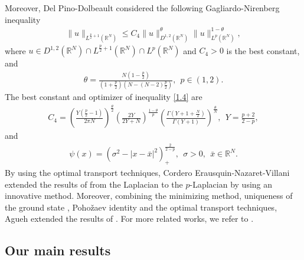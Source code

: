 \documentclass[12pt,a4paper,reqno]{amsart}
\numberwithin{equation}{section}
\begin{document}
Moreover, Del Pino-Dolbeault\cite[Theorem 2]{DelPino-Dolbeault2002JMPA}
considered the following Gagliardo-Nirenberg inequality
\begin{equation}\label{1.4}
\begin{aligned}
\|u\|_{L^{\frac{p}{2}+1}(\mathbb{R}^{N})}
\leqslant
C_{4}
\|u\|_{D^{1,2}(\mathbb{R}^{N})}^{\theta}
\|u\|_{L^{p}(\mathbb{R}^{N})}^{1-\theta},
\end{aligned}
\end{equation}
where $u\in D^{1,2}(\mathbb{R}^{N})\cap L^{\frac{p}{2}+1}(\mathbb{R}^{N})\cap L^{p}(\mathbb{R}^{N})$ and $C_{4}>0$ is the best constant, and
\begin{equation*}
\begin{aligned}
\theta=\frac{N(1-\frac{p}{2})}{(1+\frac{p}{2})(N-(N-2)\frac{p}{2})},~~p\in(1,2).
\end{aligned}
\end{equation*}
The best constant and optimizer of inequality \eqref{1.4} are
\begin{equation*}
\begin{aligned}
C_{4}
=
\left(
\frac{Y(\frac{p}{2}-1)}{2\pi N}
\right)^{\frac{\theta}{2}}
\left(
\frac{2Y}{2Y+N}
\right)^{\frac{1-\theta}{p}}
\left(
\frac{\Gamma(Y+1+\frac{N}{2})}{\Gamma(Y+1)}
\right)^{\frac{\theta}{N}},
~~
Y=\frac{p+2}{2-p},
\end{aligned}
\end{equation*}
and
\begin{equation*}
\begin{aligned}
\psi(x)=\left(\sigma^{2}-|x-\bar{x}|^{2}\right)_{+}^{\frac{2}{2-p}},~~\sigma>0,~~\bar{x}\in \mathbb{R}^{N}.
\end{aligned}
\end{equation*}
By using the optimal transport techniques, Cordero Erausquin-Nazaret-Villani
\cite{CorderoErausquin-Nazaret-Villani2004AM} extended the results of \cite{DelPino-Dolbeault2002JMPA} from the Laplacian to the $p$-Laplacian by using an innovative method.
Moreover, combining the minimizing method, uniqueness of the ground state , Poho\v{z}aev identity and the optimal transport techniques, Agueh \cite{Agueh2008NODEA}
extended the results of \cite{CorderoErausquin-Nazaret-Villani2004AM}. For more related works, we refer to \cite{Fila-Winkler2019AM}.


\subsection{Our main results}
\end{document}
